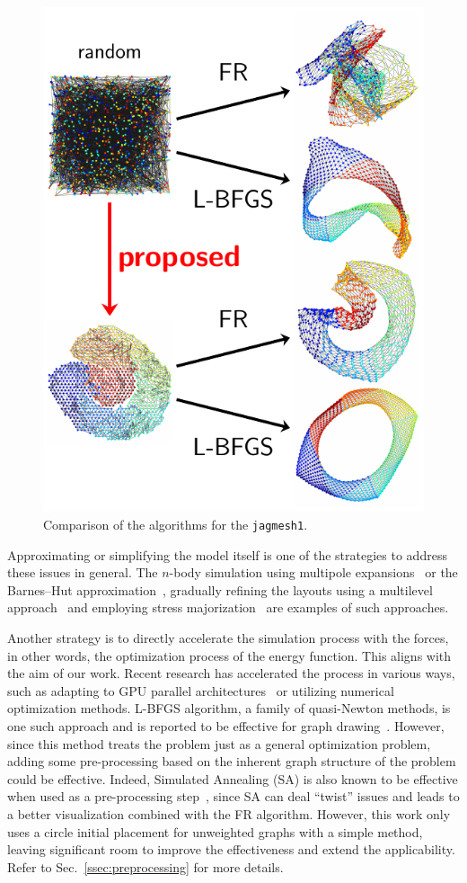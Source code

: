 \documentclass[dvipdfmx,10pt,journal,compsoc]{IEEEtran}
\begin{document}
\begin{figure}[t]
  \centering
  \includegraphics[width=0.8\columnwidth]{fig1/fig1.pdf}
  \caption{
    Comparison of the algorithms for the \texttt{jagmesh1}.
  }
  \label{fig:fig1}
\end{figure}

Approximating or simplifying the model itself is one of the strategies to address these issues in general.
The $n$-body simulation using multipole expansions~\cite{greengardFastAlgorithmParticle1987} or the Barnes--Hut approximation~\cite{barnesHierarchicalLogForcecalculation1986}, gradually refining the layouts using a multilevel approach~\cite{Hu2006EfficientHF} and employing stress majorization~\cite{gansnerGraphDrawingStress2005} are examples of such approaches.

Another strategy is to directly accelerate the simulation process with the forces, in other words, the optimization process of the energy function.
This aligns with the aim of our work.
Recent research has accelerated the process in various ways, such as adapting to GPU parallel architectures~\cite{gajdosParallelFruchtermanReingold2016} or utilizing numerical optimization methods.
L-BFGS algorithm, a family of quasi-Newton methods, is one such approach and is reported to be effective for graph drawing~\cite{6183577}.
However, since this method treats the problem just as a general optimization problem, adding some pre-processing based on the inherent graph structure of the problem could be effective.
Indeed, Simulated Annealing (SA) is also known to be effective when used as a pre-processing step~\cite{ghassemitoosiSimulatedAnnealingPreProcessing2016}, since SA can deal ``twist'' issues and leads to a better visualization combined with the FR algorithm.
However, this work only uses a circle initial placement for unweighted graphs with a simple method, leaving significant room to improve the effectiveness and extend the applicability. Refer to Sec.~\ref{ssec:preprocessing} for more details.
\end{document}
